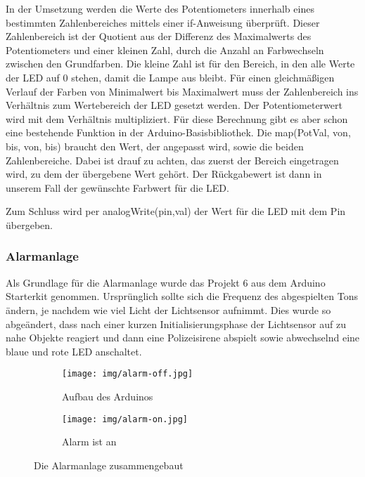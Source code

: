 In der Umsetzung werden die Werte des Potentiometers innerhalb eines bestimmten Zahlenbereiches mittels einer if-Anweisung überprüft. Dieser Zahlenbereich ist der Quotient aus der Differenz des Maximalwerts des Potentiometers und einer kleinen Zahl, durch die Anzahl an Farbwechseln zwischen den Grundfarben. Die kleine Zahl ist für den Bereich, in den alle Werte der LED auf 0 stehen, damit die Lampe aus bleibt. Für einen gleichmäßigen Verlauf der Farben von Minimalwert bis Maximalwert muss der Zahlenbereich ins Verhältnis zum Wertebereich der LED gesetzt werden. Der Potentiometerwert wird mit dem Verhältnis multipliziert. Für diese Berechnung gibt es aber schon eine bestehende Funktion in der Arduino-Basisbibliothek. Die map(PotVal, von, bis, von, bis) braucht den Wert, der angepasst wird, sowie die beiden Zahlenbereiche. Dabei ist drauf zu achten, das zuerst der Bereich eingetragen wird, zu dem der übergebene Wert gehört. Der Rückgabewert ist dann in unserem Fall der gewünschte Farbwert für die LED.

Zum Schluss wird per analogWrite(pin,val) der Wert für die LED mit dem Pin übergeben.


\subsubsection{Alarmanlage}
Als Grundlage für die Alarmanlage wurde das Projekt 6 aus dem Arduino Starterkit genommen. Ursprünglich sollte sich die Frequenz des abgespielten Tons ändern, je nachdem wie viel Licht der Lichtsensor aufnimmt. Dies wurde so abgeändert, dass nach einer kurzen Initialisierungsphase der Lichtsensor auf zu nahe Objekte reagiert und dann eine Polizeisirene abspielt sowie abwechselnd eine blaue und rote LED anschaltet.

\begin{figure}[h]
	\centering
	\begin{subfigure}[b]{0.48\linewidth}
		\centering
		\texttt{[image: img/alarm-off.jpg]}
		\caption{Aufbau des Arduinos}
	\end{subfigure}\enspace%
	\begin{subfigure}[b]{0.48\linewidth}
		\centering
		\texttt{[image: img/alarm-on.jpg]}
		\caption{Alarm ist an}
	\end{subfigure}
	\caption{Die Alarmanlage zusammengebaut}
\end{figure}

